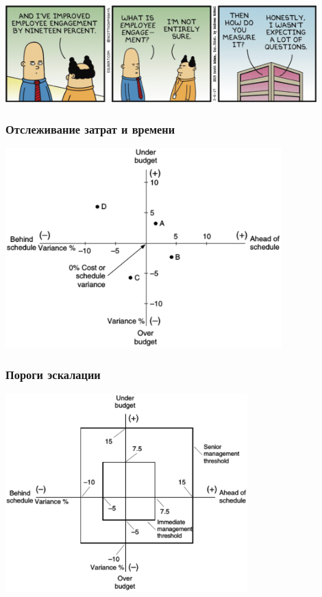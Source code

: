 \documentclass{../../slides-style}
\begin{document}
    \begin{frame}
        \begin{center}
            \includegraphics[width=0.9\textwidth]{dilbertEmployeeEngagement.png}
        \end{center}
    \end{frame}

    \begin{frame}
        \frametitle{Отслеживание затрат и времени}
        \begin{center}
            \includegraphics[width=0.8\textwidth]{varianceGraph.png}
        \end{center}
    \end{frame}

    \begin{frame}
        \frametitle{Пороги эскалации}
        \begin{center}
            \includegraphics[width=0.7\textwidth]{escalationThresholds.png}
        \end{center}
    \end{frame}
\end{document}
